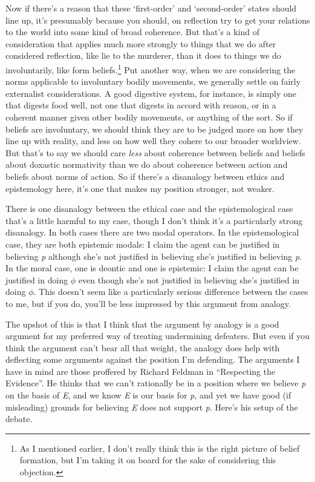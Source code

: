 \documentclass[
  11pt,
  letterpaper,
  DIV=11,
  numbers=noendperiod,
  twoside]{scrartcl}
\begin{document}
Now if there's a reason that these `first-order' and `second-order'
states should line up, it's presumably because you should, on reflection
try to get your relations to the world into some kind of broad
coherence. But that's a kind of consideration that applies much more
strongly to things that we do after considered reflection, like lie to
the murderer, than it does to things we do involuntarily, like form
beliefs.\footnote{As I mentioned earlier, I don't really think this is
  the right picture of belief formation, but I'm taking it on board for
  the sake of considering this objection.} Put another way, when we are
considering the norms applicable to involuntary bodily movements, we
generally settle on fairly externalist considerations. A good digestive
system, for instance, is simply one that digests food well, not one that
digests in accord with reason, or in a coherent manner given other
bodily movements, or anything of the sort. So if beliefs are
involuntary, we should think they are to be judged more on how they line
up with reality, and less on how well they cohere to our broader
worldview. But that's to say we should care \emph{less} about coherence
between beliefs and beliefs about doxastic normativity than we do about
coherence between action and beliefs about norms of action. So if
there's a disanalogy between ethics and epistemology here, it's one that
makes my position stronger, not weaker.

There is one disanalogy between the ethical case and the epistemological
case that's a little harmful to my case, though I don't think it's a
particularly strong disanalogy. In both cases there are two modal
operators. In the epistemological case, they are both epistemic modals:
I claim the agent can be justified in believing \emph{p} although she's
not justified in believing she's justified in believing \emph{p}. In the
moral case, one is deontic and one is epistemic: I claim the agent can
be justified in doing \(\phi\) even though she's not justified in
believing she's justified in doing \(\phi\). This doesn't seem like a
particularly serious difference between the cases to me, but if you do,
you'll be less impressed by this argument from analogy.

The upshot of this is that I think that the argument by analogy is a
good argument for my preferred way of treating undermining defeaters.
But even if you think the argument can't bear all that weight, the
analogy does help with deflecting some arguments against the position
I'm defending. The arguments I have in mind are those proffered by
Richard Feldman in ``Respecting the Evidence''. He thinks that we can't
rationally be in a position where we believe \emph{p} on the basis of
\emph{E}, and we know \emph{E} is our basis for \emph{p}, and yet we
have good (if misleading) grounds for believing \emph{E} does not
support \emph{p}. Here's his setup of the debate.
\end{document}
